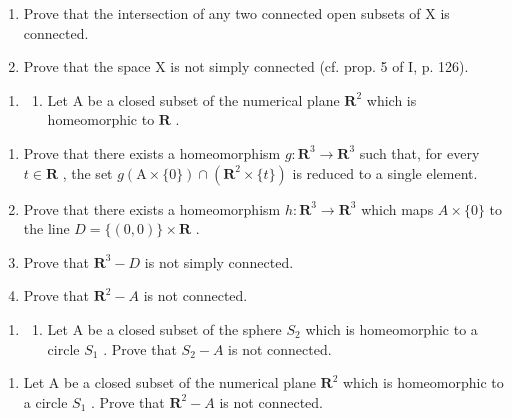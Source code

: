 \begin{enumerate}
\def\labelenumi{\alph{enumi})}
\item
  Prove that the intersection of any two connected open subsets of X is connected.
\item
  Prove that the space X is not simply connected (cf. prop. 5 of I, p. 126).
\end{enumerate}

\begin{enumerate}
\def\labelenumi{\arabic{enumi})}
\setcounter{enumi}{2}
\tightlist
\item
  \begin{enumerate}
  \def\labelenumii{(\arabic{enumii})}
  \setcounter{enumii}{2}
  \tightlist
  \item
    Let A be a closed subset of the numerical plane \(\mathbf{R}^2\) which is homeomorphic to \(\mathbf{R}\) .
  \end{enumerate}
\end{enumerate}

\begin{enumerate}
\def\labelenumi{\alph{enumi})}
\item
  Prove that there exists a homeomorphism \(g \colon \mathbf{R}^3 \to \mathbf{R}^3\) such that, for every \(t \in \mathbf{R}\) , the set \(g(\mathrm{A} \times \{0\}) \cap (\mathbf{R}^2 \times \{t\})\) is reduced to a single element.
\item
  Prove that there exists a homeomorphism \(h: \mathbf{R}^{3} \to \mathbf{R}^{3}\) which maps \(A \times \{0\}\) to the line \(D = \{(0,0)\} \times \mathbf{R}\) .
\item
  Prove that \(\mathbf{R}^{3} - D\) is not simply connected.
\item
  Prove that \(\mathbf{R}^{2} - A\) is not connected.
\end{enumerate}

\begin{enumerate}
\def\labelenumi{\arabic{enumi})}
\setcounter{enumi}{3}
\tightlist
\item
  \begin{enumerate}
  \def\labelenumii{\alph{enumii})}
  \tightlist
  \item
    Let A be a closed subset of the sphere \(S_{2}\) which is homeomorphic to a circle \(S_{1}\) . Prove that \(S_{2}-A\) is not connected.
  \end{enumerate}
\end{enumerate}

\begin{enumerate}
\def\labelenumi{\alph{enumi})}
\setcounter{enumi}{1}
\tightlist
\item
  Let A be a closed subset of the numerical plane \(\mathbf{R}^{2}\) which is homeomorphic to a circle \(S_{1}\) . Prove that \(\mathbf{R}^{2}-A\) is not connected.
\end{enumerate}

